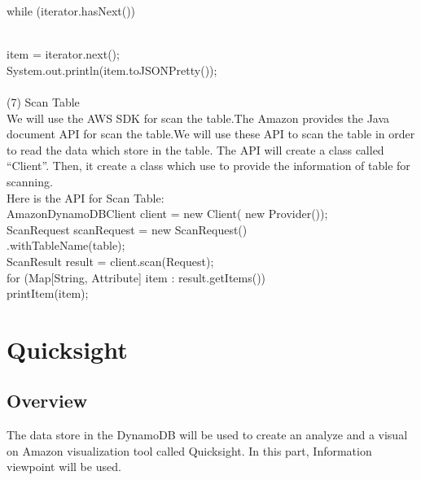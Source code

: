     while (iterator.hasNext()) {\\
    item = iterator.next();\\
    System.out.println(item.toJSONPretty());\\
\\
    (7) Scan Table \\
    We will use the AWS SDK for scan the table.The Amazon provides the Java document API for scan the table.We will use these API to scan the table in order to read the data which store in the table. The API will create a class called “Client”. Then, it create a class which use to provide the information of table for scanning.\\
    Here is the API for Scan Table\cite{w3}:\\
    AmazonDynamoDBClient client = new Client(
    new Provider());\\
    ScanRequest scanRequest = new ScanRequest()\\
    .withTableName(table);\\
    ScanResult result = client.scan(Request);\\
    for (Map[String, Attribute] item : result.getItems()){\\
    printItem(item);}\\
\section{Quicksight}
    \subsection{Overview}
    The data store in the DynamoDB will be used to create an analyze and a visual on Amazon visualization tool called Quicksight. In this part, Information viewpoint will be used.
}
